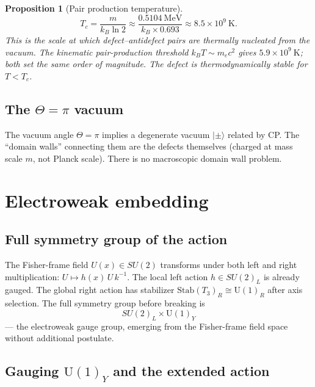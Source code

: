 \documentclass[12pt]{article}
\newtheorem{proposition}[theorem]{Proposition}
\theoremstyle{definition}
\theoremstyle{remark}
\begin{document}
\begin{proposition}[Pair production temperature]
\begin{equation}
T_c=\frac{m}{k_B\ln 2}\approx\frac{0.5104\ \mathrm{MeV}}{k_B\times 0.693}
\approx 8.5\times 10^9\ \mathrm{K}.
\end{equation}
This is the scale at which defect--antidefect pairs are thermally nucleated
from the vacuum.  The kinematic pair-production threshold
$k_BT\sim m_ec^2$ gives $5.9\times 10^9\ \mathrm{K}$; both
set the same order of magnitude.  The defect is thermodynamically stable
for $T<T_c$.
\end{proposition}

\subsection{The $\Theta=\pi$ vacuum}

The vacuum angle $\Theta=\pi$ implies a degenerate vacuum
$|\pm\rangle$ related by CP.  The ``domain walls'' connecting them are
the defects themselves (charged at mass scale $m$, not Planck scale).
There is no macroscopic domain wall problem.

\section{Electroweak embedding}
\label{sec:ew}

\subsection{Full symmetry group of the action}

The Fisher-frame field $U(x)\in SU(2)$ transforms under both left and right
multiplication: $U\mapsto h(x)\,U\,k^{-1}$.  The local left action
$h\in SU(2)_L$ is already gauged.  The global right action has stabilizer
$\mathrm{Stab}(T_3)_R\cong\mathrm{U}(1)_R$ after axis selection.  The full
symmetry group before breaking is
\begin{equation}
SU(2)_L\times\mathrm{U}(1)_Y
\end{equation}
--- the electroweak gauge group, emerging from the Fisher-frame field space
without additional postulate.

\subsection{Gauging $\mathrm{U}(1)_Y$ and the extended action}
\end{document}
